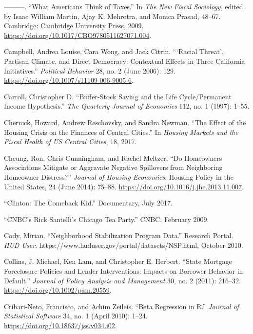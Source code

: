 \documentclass[12pt,oneside]{psthesis}
\begin{document}
\leavevmode\hypertarget{ref-campbell2009what}{}%
---------. ``What Americans Think of Taxes.'' In \emph{The New Fiscal Sociology}, edited by Isaac William Martin, Ajay K. Mehrotra, and Monica Prasad, 48--67. Cambridge: Cambridge University Press, 2009. \url{https://doi.org/10.1017/CBO9780511627071.004}.

\leavevmode\hypertarget{ref-campbell2006racial}{}%
Campbell, Andrea Louise, Cara Wong, and Jack Citrin. ```Racial Threat', Partisan Climate, and Direct Democracy: Contextual Effects in Three California Initiatives.'' \emph{Political Behavior} 28, no. 2 (June 2006): 129. \url{https://doi.org/10.1007/s11109-006-9005-6}.

\leavevmode\hypertarget{ref-carroll1997bufferstock}{}%
Carroll, Christopher D. ``Buffer-Stock Saving and the Life Cycle/Permanent Income Hypothesis.'' \emph{The Quarterly Journal of Economics} 112, no. 1 (1997): 1--55.

\leavevmode\hypertarget{ref-chernick2017effect}{}%
Chernick, Howard, Andrew Reschovsky, and Sandra Newman. ``The Effect of the Housing Crisis on the Finances of Central Cities.'' In \emph{Housing Markets and the Fiscal Health of US Central Cities}, 18, 2017.

\leavevmode\hypertarget{ref-cheung2014homeowners}{}%
Cheung, Ron, Chris Cunningham, and Rachel Meltzer. ``Do Homeowners Associations Mitigate or Aggravate Negative Spillovers from Neighboring Homeowner Distress?'' \emph{Journal of Housing Economics}, Housing Policy in the United States, 24 (June 2014): 75--88. \url{https://doi.org/10.1016/j.jhe.2013.11.007}.

\leavevmode\hypertarget{ref-albright2017clinton}{}%
``Clinton: The Comeback Kid.'' Documentary, July 2017.

\leavevmode\hypertarget{ref-santelli2009cnbc}{}%
``CNBC's Rick Santelli's Chicago Tea Party.'' CNBC, February 2009.

\leavevmode\hypertarget{ref-cody2010neighborhood}{}%
Cody, Mirian. ``Neighborhood Stabilization Program Data.'' Research Portal. \emph{HUD User}. https://www.huduser.gov/portal/datasets/NSP.html, October 2010.

\leavevmode\hypertarget{ref-collins2011state}{}%
Collins, J. Michael, Ken Lam, and Christopher E. Herbert. ``State Mortgage Foreclosure Policies and Lender Interventions: Impacts on Borrower Behavior in Default.'' \emph{Journal of Policy Analysis and Management} 30, no. 2 (2011): 216--32. \url{https://doi.org/10.1002/pam.20559}.

\leavevmode\hypertarget{ref-cribarineto2010beta}{}%
Cribari-Neto, Francisco, and Achim Zeileis. ``Beta Regression in R.'' \emph{Journal of Statistical Software} 34, no. 1 (April 2010): 1--24. \url{https://doi.org/10.18637/jss.v034.i02}.
\end{document}
